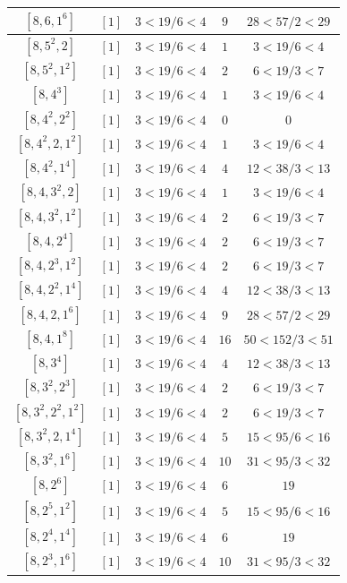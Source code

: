 \documentclass{article}%
\begin{document}
\begin{center}
\begin{longtable}{||c|c|c|c|c||}
$[8, 6, 1^{6}]$ & $[1]$ & $3 < 19/6 < 4$ & $9$ & $28 < 57/2 < 29$ \\ \hline 
$[8, 5^{2}, 2]$ & $[1]$ & $3 < 19/6 < 4$ & $1$ & $3 < 19/6 < 4$ \\ \hline 
$[8, 5^{2}, 1^{2}]$ & $[1]$ & $3 < 19/6 < 4$ & $2$ & $6 < 19/3 < 7$ \\ \hline 
$[8, 4^{3}]$ & $[1]$ & $3 < 19/6 < 4$ & $1$ & $3 < 19/6 < 4$ \\ \hline 
$[8, 4^{2}, 2^{2}]$ & $[1]$ & $3 < 19/6 < 4$ & $0$ & $0$ \\ \hline 
$[8, 4^{2}, 2, 1^{2}]$ & $[1]$ & $3 < 19/6 < 4$ & $1$ & $3 < 19/6 < 4$ \\ \hline 
$[8, 4^{2}, 1^{4}]$ & $[1]$ & $3 < 19/6 < 4$ & $4$ & $12 < 38/3 < 13$ \\ \hline 
$[8, 4, 3^{2}, 2]$ & $[1]$ & $3 < 19/6 < 4$ & $1$ & $3 < 19/6 < 4$ \\ \hline 
$[8, 4, 3^{2}, 1^{2}]$ & $[1]$ & $3 < 19/6 < 4$ & $2$ & $6 < 19/3 < 7$ \\ \hline 
$[8, 4, 2^{4}]$ & $[1]$ & $3 < 19/6 < 4$ & $2$ & $6 < 19/3 < 7$ \\ \hline 
$[8, 4, 2^{3}, 1^{2}]$ & $[1]$ & $3 < 19/6 < 4$ & $2$ & $6 < 19/3 < 7$ \\ \hline 
$[8, 4, 2^{2}, 1^{4}]$ & $[1]$ & $3 < 19/6 < 4$ & $4$ & $12 < 38/3 < 13$ \\ \hline 
$[8, 4, 2, 1^{6}]$ & $[1]$ & $3 < 19/6 < 4$ & $9$ & $28 < 57/2 < 29$ \\ \hline 
$[8, 4, 1^{8}]$ & $[1]$ & $3 < 19/6 < 4$ & $16$ & $50 < 152/3 < 51$ \\ \hline 
$[8, 3^{4}]$ & $[1]$ & $3 < 19/6 < 4$ & $4$ & $12 < 38/3 < 13$ \\ \hline 
$[8, 3^{2}, 2^{3}]$ & $[1]$ & $3 < 19/6 < 4$ & $2$ & $6 < 19/3 < 7$ \\ \hline 
$[8, 3^{2}, 2^{2}, 1^{2}]$ & $[1]$ & $3 < 19/6 < 4$ & $2$ & $6 < 19/3 < 7$ \\ \hline 
$[8, 3^{2}, 2, 1^{4}]$ & $[1]$ & $3 < 19/6 < 4$ & $5$ & $15 < 95/6 < 16$ \\ \hline 
$[8, 3^{2}, 1^{6}]$ & $[1]$ & $3 < 19/6 < 4$ & $10$ & $31 < 95/3 < 32$ \\ \hline 
$[8, 2^{6}]$ & $[1]$ & $3 < 19/6 < 4$ & $6$ & $19$ \\ \hline 
$[8, 2^{5}, 1^{2}]$ & $[1]$ & $3 < 19/6 < 4$ & $5$ & $15 < 95/6 < 16$ \\ \hline 
$[8, 2^{4}, 1^{4}]$ & $[1]$ & $3 < 19/6 < 4$ & $6$ & $19$ \\ \hline 
$[8, 2^{3}, 1^{6}]$ & $[1]$ & $3 < 19/6 < 4$ & $10$ & $31 < 95/3 < 32$ \\ \hline 

\end{longtable}
\end{center}
\end{document}
